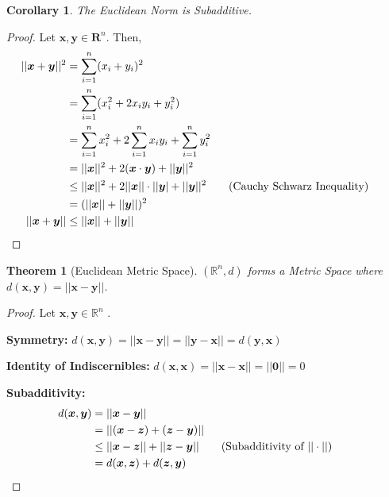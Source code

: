 \documentclass{article}
\newtheorem{theorem}{Theorem}[section]
\newtheorem{corollary}{Corollary}[theorem]
\begin{document}
			\begin{corollary}
				The Euclidean Norm is Subadditive.
			\end{corollary}
			\begin{proof}
				Let $\bm{x}, \bm{y} \in \mathbf{R}^n$. Then,
				\begin{align*}
					||\bm{x} + \bm{y}||^2 &= \sum\limits_{i=1}^n (x_i + y_i)^2\\
										  &= \sum\limits_{i=1}^n (x_i^2 + 2x_i y_i + y_i^2)\\
										  &= \sum\limits_{i=1}^n x_i^2 + 2 \sum\limits_{i=1}^n x_i y_i + \sum\limits_{i=1}^n y_i^2\\
										  &= ||\bm{x}||^2 + 2 (\bm{x} \cdot \bm{y}) + ||\bm{y}||^2\\
										  &\leq ||\bm{x}||^2 + 2 ||\bm{x}|| \cdot ||\bm{y}| + ||\bm{y}||^2 \tag{Cauchy Schwarz Inequality}\\
										  &= (||\bm{x}|| + ||\bm{y}||)^2\\
					  ||\bm{x} + \bm{y}|| &\leq ||\bm{x}|| + ||\bm{y}|| &&\qedhere
				\end{align*}
				
			\end{proof}

			\begin{theorem}[Euclidean Metric Space]
			\label{euclidean metric space}
			$(\mathbb{R}^n, d)$ forms a Metric Space where $d(\bm{x}, \bm{y}) = ||\bm{x} - \bm{y}||$.
			\end{theorem}
			\begin{proof}
				Let $\bm{x}, \bm{y} \in \mathbb{R}^n$ .
				\item \textbf{Symmetry:} $d(\bm{x},\bm{y}) = ||\bm{x}-\bm{y}|| = ||\bm{y}-\bm{x}|| = d(\bm{y},\bm{x})$
				\item \textbf{Identity of Indiscernibles:} $d(\bm{x},\bm{x}) = ||\bm{x}-\bm{x}|| = ||\bm{0}|| = 0$
				\item \textbf{Subadditivity:}
				\begin{align*}
					d(\bm{x},\bm{y}) &= ||\bm{x}-\bm{y}||\\
									 &= ||(\bm{x}-\bm{z}) + (\bm{z}-\bm{y})||\\
									 &\leq ||\bm{x}-\bm{z}|| + ||\bm{z}-\bm{y}|| \tag{Subadditivity of $||\cdot||$}\\
									 &= d(\bm{x},\bm{z}) + d(\bm{z},\bm{y}) &&\qedhere
				\end{align*}
			\end{proof}
\end{document}
